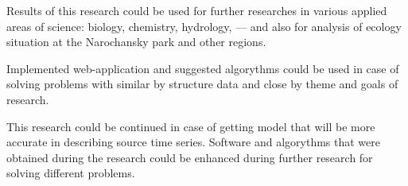Results of this research could be used for further researches in various applied areas of science: biology, chemistry, hydrology, --- and also for analysis of ecology situation at the Narochansky park and other regions.

Implemented web-application and suggested algorythms could be used in case of solving problems with similar by structure data and close by theme and goals of research.

This research could be continued in case of getting model that will be more accurate in describing source time series. Software and algorythms that were obtained during the research could be enhanced during further research for solving different problems.